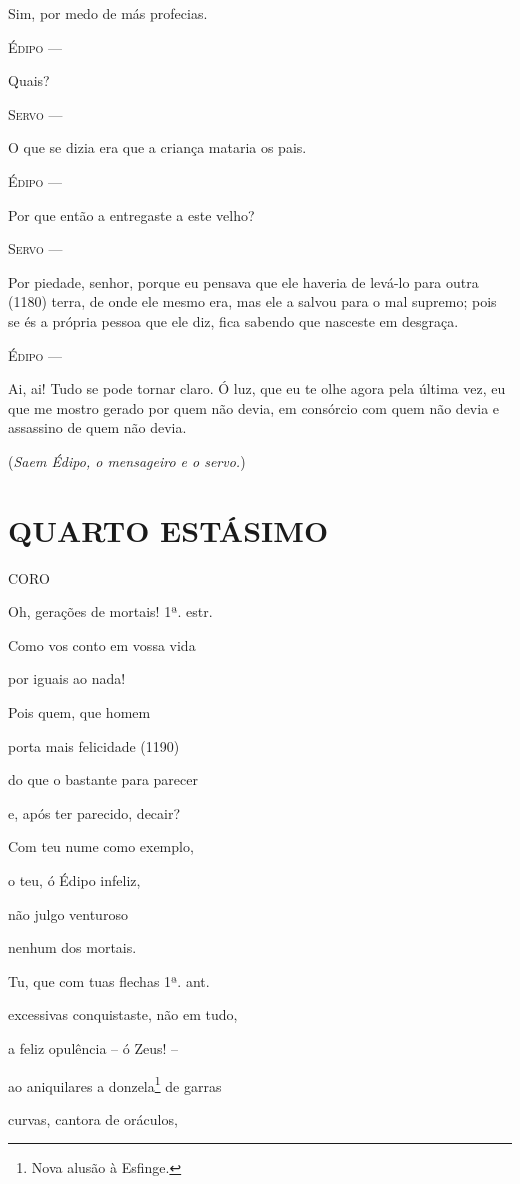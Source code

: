 Sim, por medo de más profecias.

\textsc{Édipo} ---

Quais?

\textsc{Servo} ---

O que se dizia era que a criança mataria os pais.

\textsc{Édipo} ---

Por que então a entregaste a este velho?

\textsc{Servo} ---

Por piedade, senhor, porque eu pensava que ele haveria de levá-lo para
outra (1180) terra, de onde ele mesmo era, mas ele a salvou para o mal
supremo; pois se és a própria pessoa que ele diz, fica sabendo que
nasceste em desgraça.

\textsc{Édipo} ---

Ai, ai! Tudo se pode tornar claro. Ó luz, que eu te olhe agora pela
última vez, eu que me mostro gerado por quem não devia, em consórcio com
quem não devia e assassino de quem não devia.

(\emph{Saem Édipo, o mensageiro e o servo.})

\section{QUARTO ESTÁSIMO}

\textsc{CORO}

Oh, gerações de mortais! 1ª. estr.

Como vos conto em vossa vida

por iguais ao nada!

Pois quem, que homem

porta mais felicidade (1190)

do que o bastante para parecer

e, após ter parecido, decair?

Com teu nume como exemplo,

o teu, ó Édipo infeliz,

não julgo venturoso

nenhum dos mortais.

Tu, que com tuas flechas 1ª. ant.

excessivas conquistaste, não em tudo,

a feliz opulência -- ó Zeus! --

ao aniquilares a donzela\footnote{Nova alusão à Esfinge.} de garras

curvas, cantora de oráculos,


